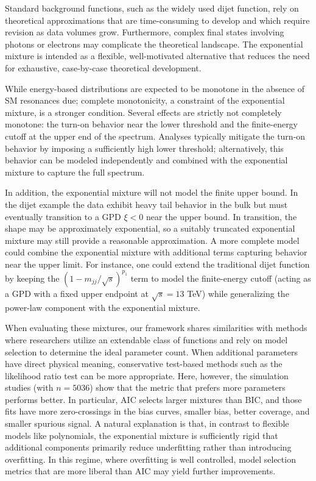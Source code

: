 \documentclass[a4paper,11pt]{article}
\begin{document}
Standard background functions, such as the widely used dijet function, rely on theoretical approximations that are time-consuming to develop and which require revision as data volumes grow. Furthermore, complex final states involving photons or electrons may complicate the theoretical landscape. The exponential mixture is intended as a flexible, well-motivated alternative that reduces the need for exhaustive, case-by-case theoretical development.

While energy-based distributions are expected to be monotone in the absence of SM resonances due; complete monotonicity, a constraint of the exponential mixture, is a stronger condition.
Several effects are strictly not completely monotone: the turn-on behavior near the lower 
threshold and the finite-energy cutoff at the upper end of the spectrum.
Analyses typically mitigate the turn-on behavior by imposing a sufficiently high lower 
threshold; alternatively, this behavior can be modeled independently and combined with the 
exponential mixture to capture the full spectrum. 

In addition, the exponential mixture will not model the finite upper bound. In the dijet example the data exhibit heavy tail behavior in the bulk but must eventually transition to a GPD $\xi<0$ near the upper bound. In transition, the shape may be approximately exponential, so a suitably truncated exponential 
mixture may still provide a reasonable approximation.
A more complete model could combine the exponential mixture with additional terms capturing 
behavior near the upper limit. For instance, one could extend the traditional dijet function by keeping the $(1-m_{jj}/\sqrt{s})^{p_1}$ term to model the finite-energy cutoff (acting as a GPD with a fixed upper endpoint at $\sqrt{s}=13$ TeV) while generalizing the power-law component with the exponential mixture.

When evaluating these mixtures, our framework shares similarities with methods where researchers utilize an extendable class of functions and rely on model selection to determine the ideal parameter count. When additional parameters have direct physical meaning, conservative test-based methods such as the likelihood ratio test can be more appropriate. Here, however, the simulation studies (with $n=5036$) show that the metric that prefers more parameters performs better. In particular, AIC selects larger mixtures than BIC, and those fits have more zero-crossings in the bias curves, smaller bias, better coverage, and smaller spurious signal. A natural explanation is that, in contrast to flexible models like polynomials, the exponential mixture is sufficiently rigid that additional components primarily reduce underfitting rather than introducing overfitting. In this regime, where overfitting is well controlled, model selection metrics that are more liberal than AIC may yield further improvements.
\end{document}
